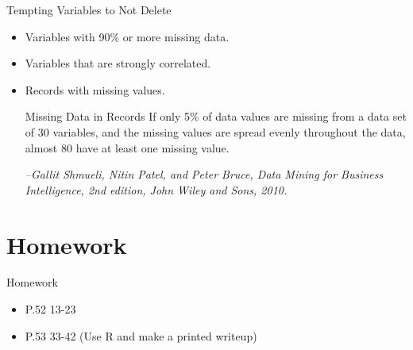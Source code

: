 \documentclass[handout]{beamer}
\begin{document}
\begin{frame}{Tempting Variables to Not Delete}
  \begin{itemize}[<+->]
  \item Variables with 90\% or more missing data.
  \item Variables that are strongly correlated.
  \item Records with missing values.
  \begin{block}{Missing Data in Records}
    If only 5\% of data values are missing
    from a data set of 30 variables, and the missing values are
    spread evenly throughout the data, almost 80%
    have at least one missing value.

   {\tiny \em --Gallit Shmueli, Nitin Patel, and Peter Bruce, Data Mining for
      Business Intelligence, 2nd edition, John Wiley and Sons, 2010. }
  \end{block}
    \end{itemize}
\end{frame}


\section{Homework}
\begin{frame}{Homework}
  \begin{itemize}
    \item P.52 13-23
    \item P.53 33-42 (Use R and make a printed writeup)
  \end{itemize}
\end{frame}
\end{document}
